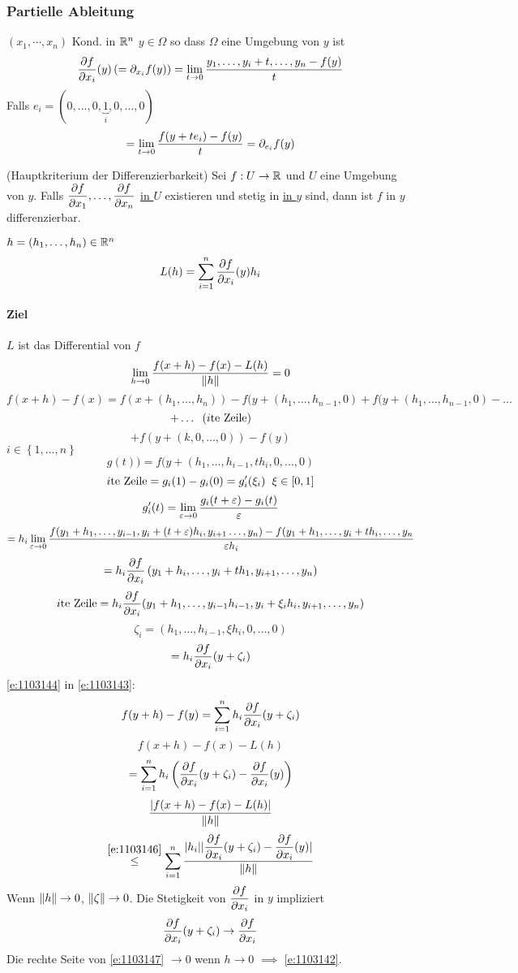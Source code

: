 \subsubsection{Partielle Ableitung}
$(x_1,\cdots,x_n)$ Kond. in $\mathbb{R}^n$ $y\in \Omega$ so dass $\Omega$ eine Umgebung von $y$ ist
\[\dfrac{\partial f}{\partial x_i}(y)\left( =\partial_{x_i}f(y) \right)=\displaystyle\lim_{t\rightarrow0}\frac{y_1,\dots,y_i+t,\dots,y_n-f(y)}{t}\]
Falls $e_i=(0,\dots,0,\underbrace{1}_i,0,\dots,0)$
\[=\displaystyle\lim_{t\rightarrow0}\frac{f(y+te_i)-f(y)}{t}=\partial_{e_i}f(y)\]
\begin{Sat}
  (Hauptkriterium der Differenzierbarkeit) Sei $f:U\rightarrow \mathbb{R}$ und $U$ eine Umgebung von $y$. Falls $\dfrac{\partial f}{\partial x_1},\dots,\dfrac{\partial f}{\partial x_n}$ \ul{in $U$} existieren und stetig in \ul{in $y$} sind, dann ist $f$ in $y$ differenzierbar.
\end{Sat}
\begin{Bew}
  $h=(h_1,\dots,h_n)\in\mathbb{R}^n$
  \[L(h)=\sum^n_{i=1}\dfrac{\partial f}{\partial x_i}(y)h_i\]
  \paragraph{Ziel} $L$ ist das Differential von $f$
  \[\displaystyle\lim_{h\rightarrow0}\frac{f(x+h)-f(x)-L(h)}{\left\| h \right\|}=0\]
  \[f(x+h)-f(x)=f(x+(h_1,\dots,h_n))-f(y+(h_1,\dots,h_{n-1},0)+f(y+(h_1,\dots,h_{n-1}, 0)-\dots\]
  \[+\dots\hspace{2mm}(\text{$i$te Zeile})\]
  \begin{equation}
    \label{e:1103143}
    +f(y+(k,0,\dots,0))-f(y)
  \end{equation}
  $i\in\left\{ 1,\dots,n \right\}$
  \[g(t))=f(y+(h_1,\dots,h_{i-1},th_i,0,\dots,0)\]
  \[\text{$i$te Zeile}=g_i(1)-g_i(0)=g_i'(\xi_i)\hspace{2mm}\xi\in \left[ 0,1 \right]\]
  \[g_i'(t)=\displaystyle\lim_{\varepsilon\rightarrow0}\frac{g_i(t+\varepsilon)-g_i(t)}{\varepsilon}\]
  \[=h_i\displaystyle\lim_{\varepsilon\rightarrow0}\frac{f(y_1+h_1,\dots,y_{i-1},y_i+(t+\varepsilon)h_i,y_{i+1}\dots,y_n)-f(y_1+h_1,\dots,y_i+th_i,\dots,y_n}{\varepsilon h_i}\]
  \[=h_i\dfrac{\partial f}{\partial x_i}\left( y_1+h_i,\dots,y_i+th_1,y_{i+1},\dots,y_n \right)\]
  \[\text{$i$te Zeile}=h_i\dfrac{\partial f}{\partial x_i}(y_1+h_1,\dots,y_{i-1}h_{i-1},y_i+\xi_ih_i,y_{i+1},\dots,y_n)\]
  \[\zeta_i=\left( h_1,\dots,h_{i-1},\xi h_i,0,\dots,0 \right)\]
  \begin{equation}
    \label{e:1103144}
    =h_i\dfrac{\partial f}{\partial x_i}(y+\zeta_i)
  \end{equation}
  \ref{e:1103144} in \ref{e:1103143}:
  \begin{equation}
    \label{e:1103145}
    f(y+h)-f(y)=\sum_{i=1}^nh_i\dfrac{\partial f}{\partial x_i}(y+\zeta_i)
  \end{equation}
  \[f(x+h)-f(x)-L(h)\]
  \begin{equation}
    \label{e:1103146}
    =\sum_{i=1}^nh_i\left( \dfrac{\partial f}{\partial x_i}(y+\zeta_i)-\dfrac{\partial f}{\partial x_i}(y) \right)
  \end{equation}
  \[\frac{\mathopen| f(x+h)-f(x)-L(h) \mathclose|}{\left\| h \right\|}\]
  \begin{equation}
    \label{e:1103147}
    \stackrel{\ref{e:1103146}}{\leq}\sum_{i=1}^n\frac{\mathopen| h_i \mathclose|\mathopen| \dfrac{\partial f}{\partial x_i}(y+\zeta_i)-\dfrac{\partial f}{\partial x_i}(y) \mathclose|}{\left\| h \right\|}
  \end{equation}
  Wenn $\left\| h \right\|\rightarrow 0$, $\left\| \zeta \right\|\rightarrow 0$. Die Stetigkeit von $\dfrac{\partial f}{\partial x_i}$ in $y$ impliziert
  \[\dfrac{\partial f}{\partial x_i}(y+\zeta_i)\rightarrow\dfrac{\partial f}{\partial x_i}\]
  Die rechte Seite von \ref{e:1103147} $\to 0$ wenn $h\to 0$ $\implies$ \ref{e:1103142}.
\end{Bew}

